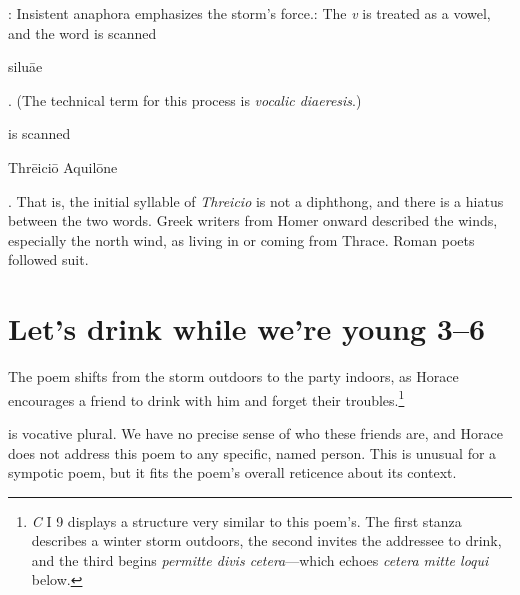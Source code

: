 
: Insistent anaphora emphasizes the storm's force.\indent{}: The \textit{v} is treated as a vowel, and the word is scanned \begin{metrica}s\-il\-u\={ae}\end{metrica}.  (The technical term for this process is \textit{vocalic diaeresis}.)


 is scanned \begin{metrica}Thr\=e\-ic\-i\=o \-Aqu\-il\=on\-e\end{metrica}.  That is, the initial syllable of \textit{Threicio} is not a diphthong, and there is a hiatus between the two words.  Greek writers from Homer onward described the winds, especially the north wind, as living in or coming from Thrace.  Roman poets followed suit.


\section*{Let's drink while we're young 3--6}

The poem shifts from the storm outdoors to the party indoors, as Horace encourages a friend to drink with him and forget their troubles.\footnote{\textit{C} I 9 displays a structure very similar to this poem's.  The first stanza describes a winter storm outdoors, the second invites the addressee to drink, and the third begins \textit{permitte divis cetera}---which echoes \textit{cetera mitte loqui} below.}


 is vocative plural.  We have no precise sense of who these friends are, and Horace does not address this poem to any specific, named person.  This is unusual for a sympotic poem, but it fits the poem's overall reticence about its context.


